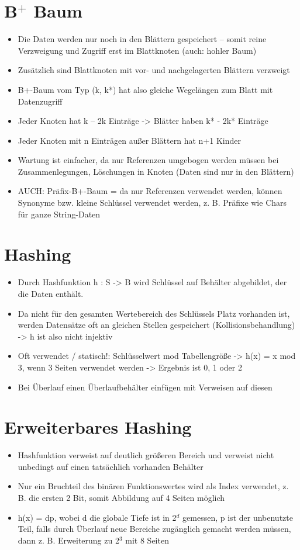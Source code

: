 \section{B$^{+}$ Baum}
\begin{itemize}
\item Die Daten werden nur noch in den Blättern gespeichert – somit reine Verzweigung und Zugriff erst im Blattknoten (auch: hohler Baum)
\item Zusätzlich sind Blattknoten mit vor- und nachgelagerten Blättern verzweigt
\item B+-Baum vom Typ (k, k*) hat also gleiche Wegelängen zum Blatt mit Datenzugriff
\item Jeder Knoten hat k – 2k Einträge -> Blätter haben k* - 2k* Einträge
\item Jeder Knoten mit n Einträgen außer Blättern hat n+1 Kinder
\item Wartung ist einfacher, da nur Referenzen umgebogen werden müssen bei Zusammenlegungen, Löschungen in Knoten (Daten sind nur in den Blättern)
\item AUCH: Präfix-B+-Baum = da nur Referenzen verwendet werden, können Synonyme bzw. kleine Schlüssel verwendet werden, z. B. Präfixe wie Chars für ganze String-Daten
\end{itemize}

\section{Hashing}

\begin{itemize}
\item Durch Hashfunktion h : S -> B wird Schlüssel auf Behälter abgebildet, der die Daten enthält.
\item Da nicht für den gesamten Wertebereich des Schlüssels Platz vorhanden ist, werden Datensätze oft an gleichen Stellen gespeichert (Kollisionsbehandlung) -> h ist also nicht injektiv
\item Oft verwendet / statisch!: Schlüsselwert mod Tabellengröße -> h(x) = x mod 3, wenn 3 Seiten verwendet werden -> Ergebnis ist 0, 1 oder 2
\item Bei Überlauf einen Überlaufbehälter einfügen mit Verweisen auf diesen
\end{itemize}

\section{Erweiterbares Hashing}
\begin{itemize}
\item Hashfunktion verweist auf deutlich größeren Bereich und verweist nicht unbedingt auf einen tatsächlich vorhanden Behälter
\item Nur ein Bruchteil des binären Funktionswertes wird als Index verwendet, z. B. die ersten 2 Bit, somit Abbildung auf 4 Seiten möglich
\item h(x) = dp, wobei d die globale Tiefe ist in 2$^d$ gemessen, p ist der unbenutzte Teil, falls durch Überlauf neue Bereiche zugänglich gemacht werden müssen, dann z. B. Erweiterung zu 2$^3$ mit 8 Seiten
\end{itemize}
